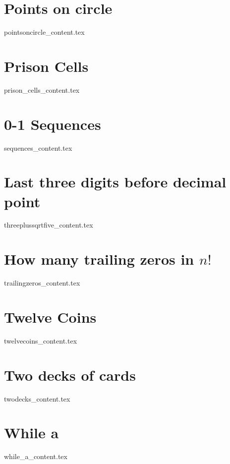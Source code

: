 \documentclass[justified, openany]{tufte-book}
\theoremstyle{plain}%
\theoremstyle{definition}
\theoremstyle{remark}
\begin{document}
\clearpage
\chapter{Points on circle}
{pointsoncircle_content.tex}

\clearpage
\chapter{Prison Cells}
{prison_cells_content.tex}

\clearpage
\chapter{0-1 Sequences}
{sequences_content.tex}

\clearpage
\chapter{Last three digits before decimal point}
{threeplussqrtfive_content.tex}

\clearpage
\chapter{How many trailing zeros in $n!$}
{trailingzeros_content.tex}

\clearpage
\chapter{Twelve Coins}
{twelvecoins_content.tex}

\clearpage
\chapter{Two decks of cards}
{twodecks_content.tex}

\clearpage
\chapter{While a}
{while_a_content.tex}

\begin{fullwidth}


\end{fullwidth}

\printindex

\listoftodos
\end{document}

